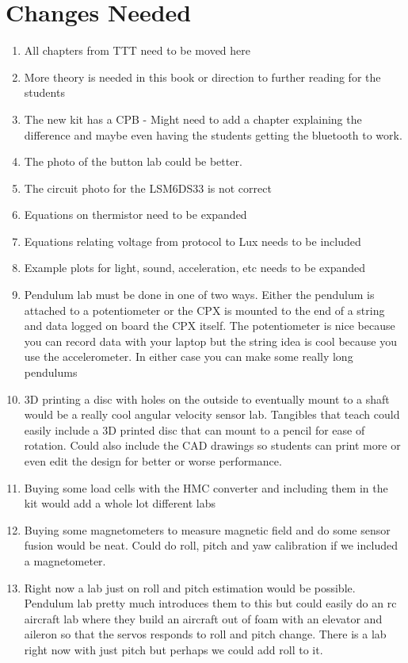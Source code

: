 \documentclass{article}
\begin{document}
\section*{Changes Needed}

\begin{enumerate}[itemsep=-5pt]
\item All chapters from TTT need to be moved here
\item More theory is needed in this book or direction to further
  reading for the students
\item The new kit has a CPB - Might need to add a chapter explaining the difference and maybe even having the students getting the bluetooth to work. 
\item The photo of the button lab could be better.
\item The circuit photo for the LSM6DS33 is not correct
\item Equations on thermistor need to be expanded
\item Equations relating voltage from protocol to Lux needs to be included
\item Example plots for light, sound, acceleration, etc needs to be expanded
\item Pendulum lab must be done in one of two ways. Either the pendulum is attached to a potentiometer or the CPX is mounted to the end of a string and data logged on board the CPX itself. The potentiometer is nice because you can record data with your laptop but the string idea is cool because you use the accelerometer. In either case you can make some really long pendulums
\item 3D printing a disc with holes on the outside to eventually mount to a shaft would be a really cool angular velocity sensor lab. Tangibles that teach could easily include a 3D printed disc that can mount to a pencil for ease of rotation. Could also include the CAD drawings so students can print more or even edit the design for better or worse performance.
\item Buying some load cells with the HMC converter and including them in the kit would add a whole lot different labs
\item Buying some magnetometers to measure magnetic field and do some sensor fusion would be neat. Could do roll, pitch and yaw calibration if we included a magnetometer.
\item Right now a lab just on roll and pitch estimation would be possible. Pendulum lab pretty much introduces them to this but could easily do an rc aircraft lab where they build an aircraft out of foam with an elevator and aileron so that the servos responds to roll and pitch change. There is a lab right now with just pitch but perhaps we could add roll to it.

\end{enumerate}
\end{document}
